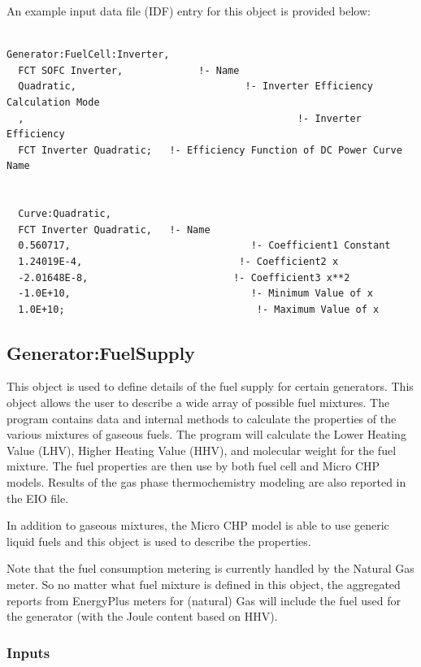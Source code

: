 An example input data file (IDF) entry for this object is provided below:

\begin{lstlisting}

Generator:FuelCell:Inverter,
  FCT SOFC Inverter,             !- Name
  Quadratic,                             !- Inverter Efficiency Calculation Mode
  ,                                               !- Inverter Efficiency
  FCT Inverter Quadratic;   !- Efficiency Function of DC Power Curve Name


  Curve:Quadratic,
  FCT Inverter Quadratic,   !- Name
  0.560717,                               !- Coefficient1 Constant
  1.24019E-4,                           !- Coefficient2 x
  -2.01648E-8,                         !- Coefficient3 x**2
  -1.0E+10,                               !- Minimum Value of x
  1.0E+10;                                 !- Maximum Value of x
\end{lstlisting}

\subsection{Generator:FuelSupply}\label{generatorfuelsupply}

This object is used to define details of the fuel supply for certain generators. This object allows the user to describe a wide array of possible fuel mixtures. The program contains data and internal methods to calculate the properties of the various mixtures of gaseous fuels. The program will calculate the Lower Heating Value (LHV), Higher Heating Value (HHV), and molecular weight for the fuel mixture. The fuel properties are then use by both fuel cell and Micro CHP models. Results of the gas phase thermochemistry modeling are also reported in the EIO file.

In addition to gaseous mixtures, the Micro CHP model is able to use generic liquid fuels and this object is used to describe the properties.

Note that the fuel consumption metering is currently handled by the Natural Gas meter. So no matter what fuel mixture is defined in this object, the aggregated reports from EnergyPlus meters for (natural) Gas will include the fuel used for the generator (with the Joule content based on HHV).

\subsubsection{Inputs}\label{inputs-19-000}

